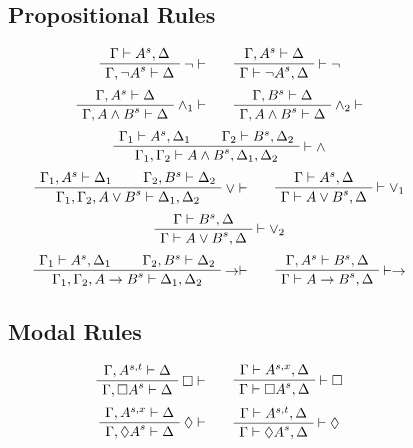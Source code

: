 \documentclass{article}
\newcommand{\seq}[2]{{#1} \vdash{} {#2}}
\newcommand{\pf}[2]{{#1}^{#2}} %
\theoremstyle{definition}
\begin{document}
\begin{figure}[p]
\subsection*{Propositional Rules}
\[
\AxiomC{$\seq{\Gamma}{\pf{A}{s}, \Delta}$}
\RightLabel{$\neg\vdash$}
\UnaryInfC{$\seq{\Gamma, \pf{\neg A}{s}}{\Delta}$}
\DisplayProof
\qquad
\AxiomC{$\seq{\Gamma, \pf{A}{s}}{\Delta}$}
\RightLabel{$\vdash\neg$}
\UnaryInfC{$\seq{\Gamma}{\pf{\neg A}{s}, \Delta}$}
\DisplayProof
\]
\[
\AxiomC{$\seq{\Gamma, \pf{A}{s}}{\Delta}$}
\RightLabel{$\wedge_1 \vdash$}
\UnaryInfC{$\seq{\Gamma, \pf{A \wedge B}{s}}{\Delta}$}
\DisplayProof
\qquad
\AxiomC{$\seq{\Gamma, \pf{B}{s}}{\Delta}$}
\RightLabel{$\wedge_2 \vdash$}
\UnaryInfC{$\seq{\Gamma, \pf{A \wedge B}{s}}{\Delta}$}
\DisplayProof
\]
\[
\AxiomC{$\seq{\Gamma_1}{\pf{A}{s}, \Delta_1}$}
\AxiomC{$\seq{\Gamma_2}{\pf{B}{s}, \Delta_2}$}
\RightLabel{$\vdash \wedge$}
\BinaryInfC{$\seq{\Gamma_1, \Gamma_2}{\pf{A \wedge B}{s}, \Delta_1, \Delta_2}$}
\DisplayProof
\]
\[
\AxiomC{$\seq{\Gamma_1, \pf{A}{s}}{\Delta_1}$}
\AxiomC{$\seq{\Gamma_2, \pf{B}{s}}{\Delta_2}$}
\RightLabel{$\vee \vdash$}
\BinaryInfC{$\seq{\Gamma_1, \Gamma_2, \pf{A \vee B}{s}}{\Delta_1, \Delta_2}$}
\DisplayProof
\qquad
\AxiomC{$\seq{\Gamma}{\pf{A}{s}, \Delta}$}
\RightLabel{$\vdash \vee_1$}
\UnaryInfC{$\seq{\Gamma}{\pf{A \vee B}{s}, \Delta}$}
\DisplayProof
\]
\[
\AxiomC{$\seq{\Gamma}{\pf{B}{s}, \Delta}$}
\RightLabel{$\vdash \vee_2$}
\UnaryInfC{$\seq{\Gamma}{\pf{A \vee B}{s}, \Delta}$}
\DisplayProof
\]
\[
\AxiomC{$\seq{\Gamma_1}{\pf{A}{s}, \Delta_1}$}
\AxiomC{$\seq{\Gamma_2, \pf{B}{s}}{\Delta_2}$}
\RightLabel{$\rightarrow \vdash$}
\BinaryInfC{$\seq{\Gamma_1, \Gamma_2, \pf{A \rightarrow B}{s}}{\Delta_1, \Delta_2}$}
\DisplayProof
\qquad
\AxiomC{$\seq{\Gamma, \pf{A}{s}}{\pf{B}{s}, \Delta}$}
\RightLabel{$\vdash \rightarrow$}
\UnaryInfC{$\seq{\Gamma}{\pf{A \rightarrow B}{s}, \Delta}$}
\DisplayProof
\]
\subsection*{Modal Rules}
\[
\AxiomC{$\seq{\Gamma, \pf{A}{s,t}}{\Delta}$}
\RightLabel{$\Box \vdash$}
\UnaryInfC{$\seq{\Gamma, \pf{\Box A}{s}}{\Delta}$}
\DisplayProof
\qquad
\AxiomC{$\seq{\Gamma}{\pf{A}{s,x}, \Delta}$}
\RightLabel{$\vdash \Box$}
\UnaryInfC{$\seq{\Gamma}{\pf{\Box A}{s}, \Delta}$}
\DisplayProof
\]
\[
\AxiomC{$\seq{\Gamma, \pf{A}{s,x}}{\Delta}$}
\RightLabel{$\Diamond \vdash$}
\UnaryInfC{$\seq{\Gamma, \pf{\Diamond A}{s}}{\Delta}$}
\DisplayProof
\qquad
\AxiomC{$\seq{\Gamma}{\pf{A}{s,t}, \Delta}$}
\RightLabel{$\vdash \Diamond$}
\UnaryInfC{$\seq{\Gamma}{\pf{\Diamond A}{s}, \Delta}$}
\DisplayProof
\]


\end{figure}
\end{document}
